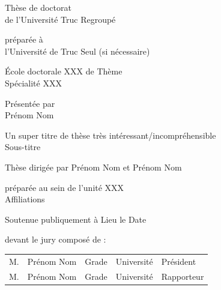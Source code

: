 \bigskip
\bigskip
\color{blueTitles}
  \begin{center}    
    \LARGE{Thèse de doctorat\\ de l'Université Truc Regroupé} \\
    \vspace{0.5cm}
    
	\color{black}
    \large{préparée à \\
    l'Université de Truc Seul (si nécessaire)} \\
	\vspace{0.5cm}
	
    \large{École doctorale XXX de Thème \\
	Spécialité XXX} \\
    \vspace{1cm}  
    
   	\normalsize{Présentée par} \\
   	\LARGE{Prénom Nom} \\
    \vspace{1.5cm}
    
	\color{blueTitles}
    \Huge{Un super titre de thèse très intéressant/incompréhensible} \\
    \LARGE{Sous-titre} \\
    \vspace{2cm}

	\color{black}
	\begin{normalsize}
	Thèse dirigée par Prénom Nom et Prénom Nom \\
	\vspace{0.25cm}
	
	préparée au sein de l'unité XXX \\
	Affiliations \\
    \vspace{1cm}
    
	Soutenue publiquement à Lieu le Date \\
	\vspace{0.25cm}
	
	devant le jury composé de :\\
	\vspace{0.5cm}
	
	\begin{tabular}{lllll}
    
    M. & Prénom Nom & Grade & Université & Président \\
   
    M. & Prénom Nom & Grade & Université & Rapporteur \\


\end{tabular}
\end{normalsize}
\end{center}
